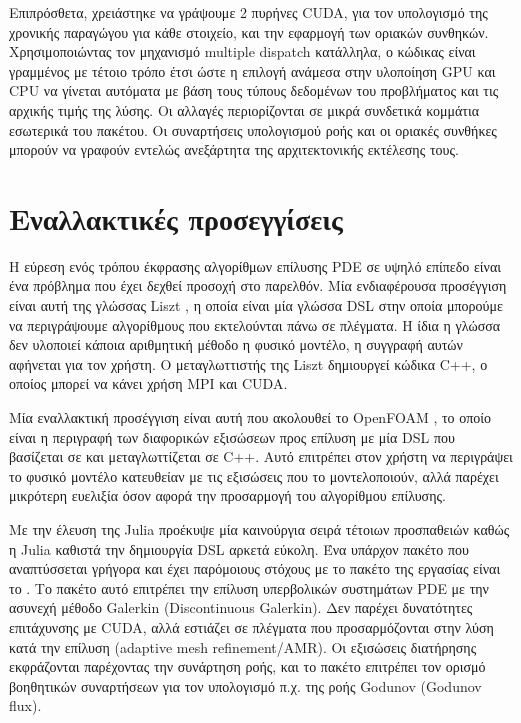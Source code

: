 Επιπρόσθετα, χρειάστηκε να γράψουμε 2 πυρήνες CUDA, για τον υπολογισμό της χρονικής παραγώγου για κάθε στοιχείο, και την εφαρμογή των οριακών συνθηκών.
Χρησιμοποιώντας τον μηχανισμό multiple dispatch κατάλληλα, ο κώδικας είναι γραμμένος με τέτοιο τρόπο έτσι ώστε η επιλογή ανάμεσα στην υλοποίηση GPU και CPU να γίνεται αυτόματα με βάση τους τύπους δεδομένων του προβλήματος και τις αρχικής τιμής της λύσης.
Οι αλλαγές περιορίζονται σε μικρά συνδετικά κομμάτια εσωτερικά του πακέτου.
Οι συναρτήσεις υπολογισμού ροής και οι οριακές συνθήκες μπορούν να γραφούν εντελώς ανεξάρτητα της αρχιτεκτονικής εκτέλεσης τους.

\section{Εναλλακτικές προσεγγίσεις}

Η εύρεση ενός τρόπου έκφρασης αλγορίθμων επίλυσης PDE σε υψηλό επίπεδο είναι ένα πρόβλημα που έχει δεχθεί προσοχή στο παρελθόν.
Μία ενδιαφέρουσα προσέγγιση είναι αυτή της γλώσσας Liszt \cite{Liszt2011}, η οποία είναι μία γλώσσα DSL στην οποία μπορούμε να περιγράψουμε αλγορίθμους που εκτελούνται πάνω σε πλέγματα.
Η ίδια η γλώσσα δεν υλοποιεί κάποια αριθμητική μέθοδο η φυσικό μοντέλο, η συγγραφή αυτών αφήνεται για τον χρήστη.
Ο μεταγλωττιστής της Liszt δημιουργεί κώδικα C++, ο οποίος μπορεί να κάνει χρήση MPI και CUDA.

Μία εναλλακτική προσέγγιση είναι αυτή που ακολουθεί το OpenFOAM \cite{Weller1998}, το οποίο είναι η περιγραφή των διαφορικών εξισώσεων προς επίλυση με μία DSL που βασίζεται σε και μεταγλωττίζεται σε C++.
Αυτό επιτρέπει στον χρήστη να περιγράψει το φυσικό μοντέλο κατευθείαν με τις εξισώσεις που το μοντελοποιούν, αλλά παρέχει μικρότερη ευελιξία όσον αφορά την προσαρμογή του αλγορίθμου επίλυσης.

Με την έλευση της Julia προέκυψε μία καινούργια σειρά τέτοιων προσπαθειών καθώς η Julia καθιστά την δημιουργία DSL αρκετά εύκολη.
Ένα υπάρχον πακέτο που αναπτύσσεται γρήγορα και έχει παρόμοιους στόχους με το πακέτο της εργασίας είναι το  \cite{Trixi2020}.
Το πακέτο αυτό επιτρέπει την επίλυση υπερβολικών συστημάτων PDE με την ασυνεχή μέθοδο Galerkin (Discontinuous Galerkin).
Δεν παρέχει δυνατότητες επιτάχυνσης με CUDA, αλλά εστιάζει σε πλέγματα που προσαρμόζονται στην λύση κατά την επίλυση (adaptive mesh refinement/AMR).
Οι εξισώσεις διατήρησης εκφράζονται παρέχοντας την συνάρτηση ροής, και το πακέτο επιτρέπει τον ορισμό βοηθητικών συναρτήσεων για τον υπολογισμό π.χ. της ροής Godunov (Godunov flux).


